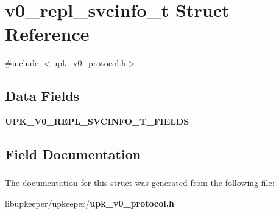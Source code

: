 \section{v0\_\-repl\_\-svcinfo\_\-t Struct Reference}
\label{structv0__repl__svcinfo__t}


{\ttfamily \#include $<$upk\_\-v0\_\-protocol.h$>$}

\subsection*{Data Fields}
\begin{DoxyCompactItemize}
\item 
{\bf UPK\_\-V0\_\-REPL\_\-SVCINFO\_\-T\_\-FIELDS}
\end{DoxyCompactItemize}


\subsection{Field Documentation}
\subsubsection[{UPK\_\-V0\_\-REPL\_\-SVCINFO\_\-T\_\-FIELDS}]{}\label{structv0__repl__svcinfo__t_ac45c5a0c20f0119ce2fdc8a604d40f8f}


The documentation for this struct was generated from the following file:\begin{DoxyCompactItemize}
\item 
libupkeeper/upkeeper/{\bf upk\_\-v0\_\-protocol.h}\end{DoxyCompactItemize}
